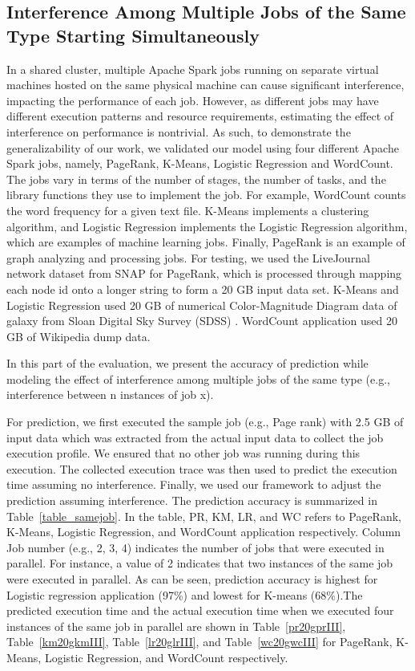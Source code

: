 \subsection{Interference Among Multiple Jobs of the Same Type Starting Simultaneously}

\noindent
In a shared cluster, multiple Apache Spark jobs running on separate virtual machines hosted on the same physical machine can cause significant interference, impacting the performance of each job. However, as different jobs may have different execution patterns and resource requirements, estimating the effect of interference on performance is nontrivial. As such, to demonstrate the generalizability of our work, we validated our model using four different Apache Spark jobs, namely, PageRank, K-Means, Logistic Regression and WordCount. The jobs vary in terms of the number of stages, the number of tasks, and the library functions they use to implement the job. For example, WordCount counts the word frequency for a given text file. K-Means implements a clustering algorithm, and Logistic Regression implements the Logistic Regression algorithm, which are examples of machine learning jobs. Finally, PageRank is an example of graph analyzing and processing jobs. For testing, we used the LiveJournal network dataset from SNAP \cite{snap} for PageRank, which is processed through mapping each node id onto a longer string to form a 20 GB input data set. K-Means and Logistic Regression used 20 GB of numerical Color-Magnitude Diagram data of galaxy from Sloan Digital Sky Survey (SDSS) \cite{sdss}. WordCount application used 20 GB of Wikipedia dump data.


\noindent
In this part of the evaluation, we present the accuracy of prediction while modeling the effect of interference among multiple jobs of the same type (e.g., interference between n instances of job x).





\noindent

For prediction, we first executed the sample job (e.g., Page rank) with 2.5 GB of input data which was extracted from the actual input data to collect the job execution profile. We ensured that no other job was running during this execution. The collected execution trace was then used to predict the execution time assuming no interference. Finally, we used our framework to adjust the prediction assuming interference. The prediction accuracy is summarized in Table~\ref{table_samejob}. In the table, PR, KM, LR, and WC refers to PageRank, K-Means, Logistic Regression, and WordCount application respectively. Column Job number (e.g., 2, 3, 4) indicates the number of jobs that were executed in parallel. For instance, a value of 2 indicates that two instances of the same job were executed in parallel. As can be seen, prediction accuracy is highest for Logistic regression application (97\%) and lowest for K-means (68\%).The predicted execution time and the actual execution time when we executed four instances of the same job in parallel are shown in Table~\ref{pr20gprIII}, Table~\ref{km20gkmIII}, Table~\ref{lr20glrIII}, and Table~\ref{wc20gwcIII} for PageRank, K-Means, Logistic Regression, and WordCount respectively. 

